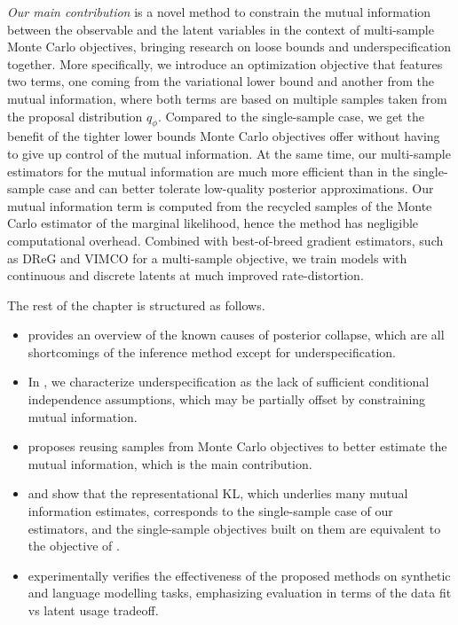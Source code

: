 \emph{Our main contribution} is a novel method to constrain the mutual information between the observable and the latent variables in the context of multi-sample Monte Carlo objectives, bringing research on loose bounds and underspecification together.
More specifically, we introduce an optimization objective that features two terms, one coming from the variational lower bound and another from the mutual information, where both terms are based on multiple samples taken from the proposal distribution $q_\phi$.
Compared to the single-sample case, we get the benefit of the tighter lower bounds Monte Carlo objectives offer without having to give up control of the mutual information.
At the same time, our multi-sample estimators for the mutual information are much more efficient than in the single-sample case and can better tolerate low-quality posterior approximations.
Our mutual information term is computed from the recycled samples of the Monte Carlo estimator of the marginal likelihood, hence the method has negligible computational overhead.
Combined with best-of-breed gradient estimators, such as DReG \citep{tucker2018doubly} and VIMCO \citep{mnih2016variational} for a multi-sample objective, we train models with continuous and discrete latents at much improved rate-distortion.

The rest of the chapter is structured as follows.
\begin{itemize}
\item {} provides an overview of the known causes of posterior collapse, which are all shortcomings of the inference method except for underspecification.
\item In , we characterize underspecification as the lack of sufficient conditional independence assumptions, which may be partially offset by constraining mutual information.
\item {} proposes reusing samples from Monte Carlo objectives to better estimate the mutual information, which is the main contribution.
\item {} and  show that the representational KL, which underlies many mutual information estimates, corresponds to the single-sample case of our estimators, and the single-sample objectives built on them are equivalent to the \betavae objective of \citet{higgins2016beta}.
\item {} experimentally verifies the effectiveness of the proposed methods on synthetic and language modelling tasks, emphasizing evaluation in terms of the data fit vs latent usage tradeoff.
\end{itemize}

